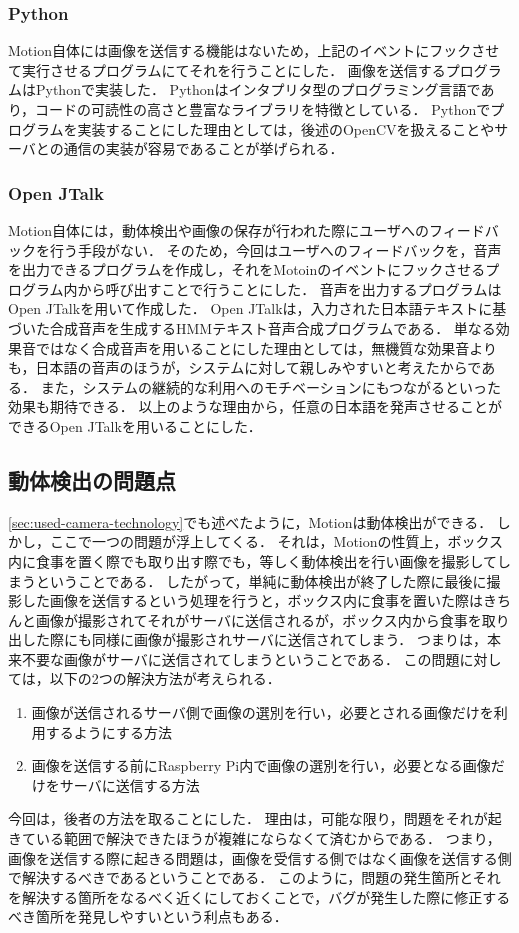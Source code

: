 \documentclass[../report]{subfiles}
\begin{document}
\subsubsection{Python}
Motion自体には画像を送信する機能はないため，上記のイベントにフックさせて実行させるプログラムにてそれを行うことにした．
画像を送信するプログラムはPythonで実装した．
Pythonはインタプリタ型のプログラミング言語であり，コードの可読性の高さと豊富なライブラリを特徴としている．
Pythonでプログラムを実装することにした理由としては，後述のOpenCVを扱えることやサーバとの通信の実装が容易であることが挙げられる．

\subsubsection{Open JTalk}
Motion自体には，動体検出や画像の保存が行われた際にユーザへのフィードバックを行う手段がない．
そのため，今回はユーザへのフィードバックを，音声を出力できるプログラムを作成し，それをMotoinのイベントにフックさせるプログラム内から呼び出すことで行うことにした．
音声を出力するプログラムはOpen JTalkを用いて作成した．
Open JTalkは，入力された日本語テキストに基づいた合成音声を生成するHMMテキスト音声合成プログラムである．
単なる効果音ではなく合成音声を用いることにした理由としては，無機質な効果音よりも，日本語の音声のほうが，システムに対して親しみやすいと考えたからである．
また，システムの継続的な利用へのモチベーションにもつながるといった効果も期待できる．
以上のような理由から，任意の日本語を発声させることができるOpen JTalkを用いることにした．

\subsection{動体検出の問題点} \label{sec:problem-detect-motion}
\ref{sec:used-camera-technology}でも述べたように，Motionは動体検出ができる．
しかし，ここで一つの問題が浮上してくる．
それは，Motionの性質上，ボックス内に食事を置く際でも取り出す際でも，等しく動体検出を行い画像を撮影してしまうということである．
したがって，単純に動体検出が終了した際に最後に撮影した画像を送信するという処理を行うと，ボックス内に食事を置いた際はきちんと画像が撮影されてそれがサーバに送信されるが，ボックス内から食事を取り出した際にも同様に画像が撮影されサーバに送信されてしまう．
つまりは，本来不要な画像がサーバに送信されてしまうということである．
この問題に対しては，以下の2つの解決方法が考えられる．
\begin{enumerate}
    \item 画像が送信されるサーバ側で画像の選別を行い，必要とされる画像だけを利用するようにする方法
    \item 画像を送信する前にRaspberry Pi内で画像の選別を行い，必要となる画像だけをサーバに送信する方法
\end{enumerate}
今回は，後者の方法を取ることにした．
理由は，可能な限り，問題をそれが起きている範囲で解決できたほうが複雑にならなくて済むからである．
つまり，画像を送信する際に起きる問題は，画像を受信する側ではなく画像を送信する側で解決するべきであるということである．
このように，問題の発生箇所とそれを解決する箇所をなるべく近くにしておくことで，バグが発生した際に修正するべき箇所を発見しやすいという利点もある．
\end{document}

